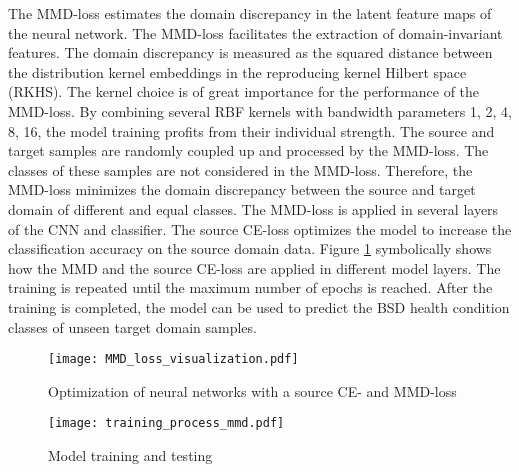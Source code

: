 The MMD-loss estimates the domain discrepancy in the latent feature maps of the neural network. The MMD-loss facilitates the extraction of domain-invariant features. The domain discrepancy is measured as the squared distance between the distribution kernel embeddings in the reproducing kernel Hilbert space (RKHS). The kernel choice is of great importance for the performance of the MMD-loss. By combining several RBF kernels with bandwidth parameters 1, 2, 4, 8, 16, the model training profits from their individual strength. The source and target samples are randomly coupled up and processed by the MMD-loss. The classes of these samples are not considered in the MMD-loss. Therefore, the MMD-loss minimizes the domain discrepancy between the source and target domain of different and equal classes. The MMD-loss is applied in several layers of the CNN and classifier. The source CE-loss optimizes the model to increase the classification accuracy on the source domain data. Figure \ref{fig:MMD_Loss_and_CE_loss} symbolically shows how the MMD and the source CE-loss are applied in different model layers. The training is repeated until the maximum number of epochs is reached. After the training is completed, the model can be used to predict the BSD health condition classes of unseen target domain samples. 



\begin{figure}[H]
  \centering
  \texttt{[image: MMD\_loss\_visualization.pdf]}
  \caption {Optimization of neural networks with a source CE- and MMD-loss} \label{fig:MMD_Loss_and_CE_loss}
\end{figure}

\begin{figure}[H]
  \centering
  \texttt{[image: training\_process\_mmd.pdf]}
  \caption {Model training and testing} \label{fig:Training_Process_MMD}
\end{figure}

